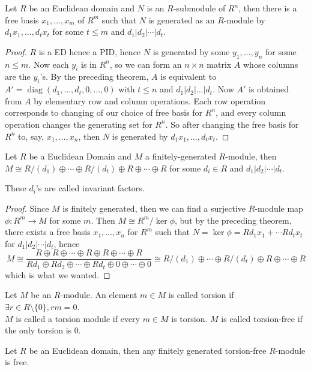 \begin{theorem}
    Let $R$ be an Euclidean domain and $N$ is an $R$-submodule of $R^n$, then there is a free basis $x_1,\ldots,x_m$ of $R^m$ such that $N$ is generated as an $R$-module by $d_1x_1,\ldots,d_tx_t$ for some $t\le m$ and $d_1|d_2|\cdots|d_t$.
\end{theorem}
\begin{proof}
    $R$ is a ED hence a PID, hence $N$ is generated by some $y_1,\ldots,y_n$ for some $n\le m$.
    Now each $y_i$ is in $R^n$, so we can form an $n\times n$ matrix $A$ whose columns are the $y_i$'s.
    By the preceding theorem, $A$ is equivalent to $A'=\operatorname{diag}(d_1,\ldots,d_t,0,\ldots,0)$ with $t\le n$ and $d_1|d_2|\ldots|d_t$.
    Now $A'$ is obtained from $A$ by elementary row and column operations.
    Each row operation corresponds to changing of our choice of free basis for $R^n$, and every column operation changes the generating set for $R^n$.
    So after changing the free basis for $R^n$ to, say, $x_1,\ldots, x_n$, then $N$ is generated by $d_1x_1,\ldots,d_tx_t$.
\end{proof}
\begin{theorem}
    Let $R$ be a Euclidean Domain and $M$ a finitely-generated $R$-module, then $M\cong R/(d_1)\oplus\cdots\oplus R/(d_t)\oplus R\oplus\cdots\oplus R$ for some $d_i\in R$ and $d_1|d_2|\cdots|d_t$.
\end{theorem}
These $d_i$'s are called invariant factors.
\begin{proof}
    Since $M$ is finitely generated, then we can find a surjective $R$-module map $\phi:R^m\to M$ for some $m$.
    Then $M\cong R^m/\ker\phi$, but by the preceding theorem, there exists a free basis $x_1,\ldots,x_n$ for $R^m$ such that $N=\ker\phi=Rd_1x_1+\cdots Rd_tx_t$ for $d_1|d_2|\cdots|d_t$, hence
    $$M\cong\frac{R\oplus R\oplus\cdots\oplus R\oplus R\oplus\cdots\oplus R}{Rd_1\oplus Rd_2\oplus\cdots\oplus Rd_t\oplus 0\oplus\cdots\oplus 0}\cong R/(d_1)\oplus\cdots\oplus R/(d_t)\oplus R\oplus\cdots\oplus R$$
    which is what we wanted.
\end{proof}
\begin{definition}
    Let $M$ be an $R$-module.
    An element $m\in M$ is called torsion if $\exists r\in R\setminus\{0\},rm=0$.\\
    $M$ is called a torsion module if every $m\in M$ is torsion.
    $M$ is called torsion-free if the only torsion is $0$.
\end{definition}
\begin{corollary}
    Let $R$ be an Euclidean domain, then any finitely generated torsion-free $R$-module is free.
\end{corollary}

